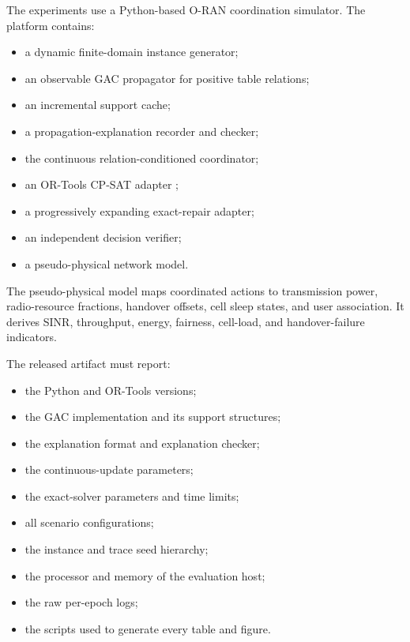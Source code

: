 \documentclass[pdflatex,sn-mathphys-num,iicol,oneside]{sn-jnl}
\begin{document}
The experiments use a Python-based O-RAN coordination simulator. The
platform contains:

\begin{itemize}
    \item a dynamic finite-domain instance generator;
    \item an observable GAC propagator for positive table relations;
    \item an incremental support cache;
    \item a propagation-explanation recorder and checker;
    \item the continuous relation-conditioned coordinator;
    \item an OR-Tools CP-SAT adapter
    \cite{ortools,perron2023cpsat};
    \item a progressively expanding exact-repair adapter;
    \item an independent decision verifier;
    \item a pseudo-physical network model.
\end{itemize}

The pseudo-physical model maps coordinated actions to transmission
power, radio-resource fractions, handover offsets, cell sleep states,
and user association. It derives SINR, throughput, energy, fairness,
cell-load, and handover-failure indicators.

The released artifact must report:

\begin{itemize}
    \item the Python and OR-Tools versions;
    \item the GAC implementation and its support structures;
    \item the explanation format and explanation checker;
    \item the continuous-update parameters;
    \item the exact-solver parameters and time limits;
    \item all scenario configurations;
    \item the instance and trace seed hierarchy;
    \item the processor and memory of the evaluation host;
    \item the raw per-epoch logs;
    \item the scripts used to generate every table and figure.
\end{itemize}

\end{document}
